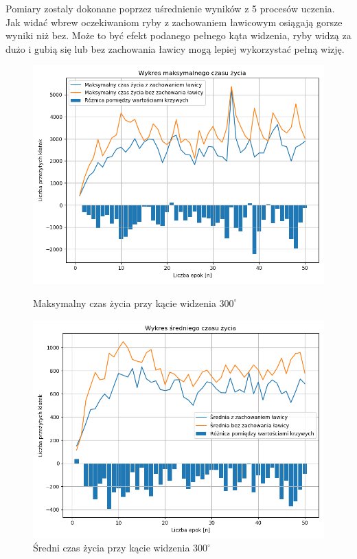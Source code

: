 \documentclass{article}
\begin{document}
Pomiary zostaly dokonane poprzez uśrednienie wyników z 5 procesów uczenia. Jak widać wbrew oczekiwaniom ryby z zachowaniem ławicowym osiągają gorsze wyniki niż bez. Może to być efekt podanego pełnego kąta widzenia, ryby widzą za dużo i gubią się lub bez zachowania ławicy mogą lepiej wykorzystać pełną wizję. 
\begin{figure}[H]
    \begin{minipage}{0.48\textwidth}
        \centering
        \includegraphics[width=\textwidth]{maximum_lifetime_angle_300.png}
        \caption{Maksymalny czas życia przy kącie widzenia \(300^{\circ}\)}
    \end{minipage}
    \hspace{0.02\textwidth}
    \begin{minipage}{0.48\textwidth}
        \centering
        \includegraphics[width=\textwidth]{average_lifetime_angle_300.png}
        \caption{Średni czas życia przy kącie widzenia \(300^{\circ}\)}
    \end{minipage}
\end{figure}
\end{document}
